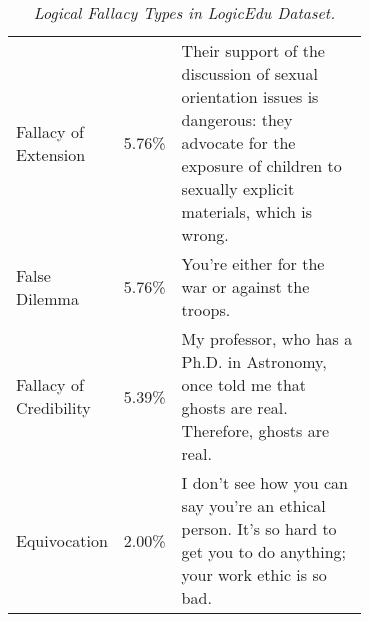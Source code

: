 \begin{table*}[ht]
\begin{tabular}{lrp{0.7\linewidth}}
Fallacy of Extension   & 5.76\%       & Their support of the discussion of sexual orientation issues is dangerous: they advocate for the exposure of children to sexually explicit materials, which is wrong. \\
False Dilemma          & 5.76\%       & You’re either for the war or against the troops.                                                                                                                      \\
Fallacy of Credibility & 5.39\%       & My professor, who has a Ph.D. in Astronomy, once told me that ghosts are real. Therefore, ghosts are real.                                                            \\
Equivocation           & 2.00\%       & I don’t see how you can say you’re an ethical person. It’s so hard to get you to do anything; your work ethic is so bad.                                             
\end{tabular}
\caption{\emph{Logical Fallacy Types in LogicEdu Dataset.}
\label{table:logicedu}
   }
\end{table*}